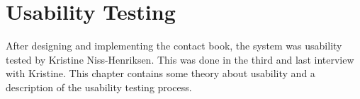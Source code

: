 \chapter{Usability Testing}
After designing and implementing the contact book, the system was usability tested by Kristine Niss-Henriksen. This was done in the third and last interview with Kristine.
This chapter contains some theory about usability and a description of the usability testing process.

  